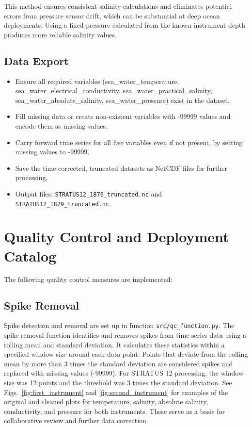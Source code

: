 \documentclass[11pt]{article}
\newcommand{\projectname}{STRATUS}  %
\newcommand{\casenumber}{12}  %
\newcommand{\FirstInstrument}{1876}
\newcommand{\SecondInstrument}{1879}
\newcommand{\WindowSize}{12}  %
\newcommand{\ThresholdValue}{3}  %
\begin{document}
This method ensures consistent salinity calculations and eliminates potential errors from pressure sensor drift, 
which can be substantial at deep ocean deployments. 
Using a fixed pressure calculated from the known instrument depth produces more reliable salinity values.

\subsection{Data Export}

\begin{itemize}
\item Ensure all required variables (sea\_water\_temperature, sea\_water\_electrical\_conductivity, sea\_water\_practical\_salinity, sea\_water\_absolute\_salinity, sea\_water\_pressure) exist in the dataset.
\item Fill missing data or create non-existent variables with -99999 values and encode them as missing values.
\item Carry forward time series for all five variables even if not present, by setting missing values to -99999.
\item Save the time-corrected, truncated datasets as NetCDF files for further processing.
\item Output files: 
\texttt{\projectname\casenumber\_\FirstInstrument\_truncated.nc}
and \texttt{\projectname\casenumber\_\SecondInstrument\_truncated.nc}.
\end{itemize}


\section{Quality Control and Deployment Catalog}
The following quality control measures are implemented:

\subsection{Spike Removal}
Spike detection and removal are set up in function \texttt{src/qc\_function.py}. 
The spike removal function identifies and removes spikes from time series data using a rolling mean and standard deviation. 
It calculates these statistics within a specified window size around each data point. 
Points that deviate from the rolling mean by more than \ThresholdValue{} times the standard deviation are considered spikes and replaced with missing values (-99999). 
For \projectname{} \casenumber{} processing, the window size was \WindowSize{} points and the threshold was \ThresholdValue{} times the standard deviation.
See Figs.~\ref{fig:first_instrument} and \ref{fig:second_instrument} for examples of the original and cleaned plots for temperature, salinity, absolute salinity, conductivity, and pressure for both instruments.
These serve as a basis for collaborative review and further data correction.
\end{document}
